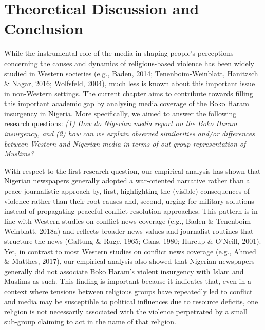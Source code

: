 \newpage
\section{Theoretical Discussion and Conclusion}
\label{sec:45}

While the instrumental role of the media in shaping people's perceptions concerning the causes and dynamics of religious-based violence has been widely studied in Western societies (e.g., Baden, 2014; Tenenboim-Weinblatt, Hanitzsch \& Nagar, 2016; Wolfsfeld, 2004), much less is known about this important issue in non-Western settings. The current chapter aims to contribute towards filling this important academic gap by analysing media coverage of the Boko Haram insurgency in Nigeria. More specifically, we aimed to answer the following research questions: \textit{(1) How do Nigerian media report on the Boko Haram insurgency, and (2) how can we explain observed similarities and/or differences between Western and Nigerian media in terms of out-group representation of Muslims? }


With respect to the first research question, our empirical analysis has shown that Nigerian newspapers generally adopted a war-oriented narrative rather than a peace journalistic approach by, first, highlighting the (visible) consequences of violence rather than their root causes and, second, urging for military solutions instead of propagating peaceful conflict resolution approaches. This pattern is in line with Western studies on conflict news coverage (e.g., Baden \& Tenenboim-Weinblatt, 2018a) and reflects broader news values and journalist routines that structure the news (Galtung \& Ruge, 1965; Gans, 1980; Harcup \& O'Neill, 2001). Yet, in contrast to most Western studies on conflict news coverage (e.g., Ahmed \& Matthes, 2017), our empirical analysis also showed that Nigerian newspapers generally did not associate Boko Haram's violent insurgency with Islam and Muslims as such. This finding is important because it indicates that, even in a context where tensions between religious groups have repeatedly led to conflict and media may be susceptible to political influences due to resource deficits, one religion is not necessarily associated with the violence perpetrated by a small sub-group claiming to act in the name of that religion.


